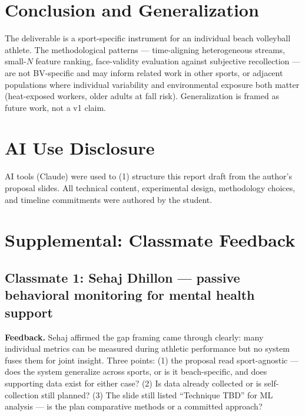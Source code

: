 \documentclass[sigconf,nonacm]{acmart}
\begin{document}
\section{Conclusion and Generalization}

The deliverable is a sport-specific instrument for an individual beach volleyball athlete. The methodological patterns --- time-aligning heterogeneous streams, small-$N$ feature ranking, face-validity evaluation against subjective recollection --- are not BV-specific and may inform related work in other sports, or adjacent populations where individual variability and environmental exposure both matter (heat-exposed workers, older adults at fall risk). Generalization is framed as future work, not a v1 claim.

\section{AI Use Disclosure}

AI tools (Claude) were used to (1) structure this report draft from the author's proposal slides. All technical content, experimental design, methodology choices, and timeline commitments were authored by the student. 

\clearpage
\onecolumn
\section*{Supplemental: Classmate Feedback}

\subsection*{Classmate 1: Sehaj Dhillon --- passive behavioral monitoring for mental health support}

\textbf{Feedback.} Sehaj affirmed the gap framing came through clearly: many individual metrics can be measured during athletic performance but no system fuses them for joint insight. Three points: (1) the proposal read sport-agnostic --- does the system generalize across sports, or is it beach-specific, and does supporting data exist for either case? (2) Is data already collected or is self-collection still planned? (3) The slide still listed ``Technique TBD'' for ML analysis --- is the plan comparative methods or a committed approach?
\end{document}
